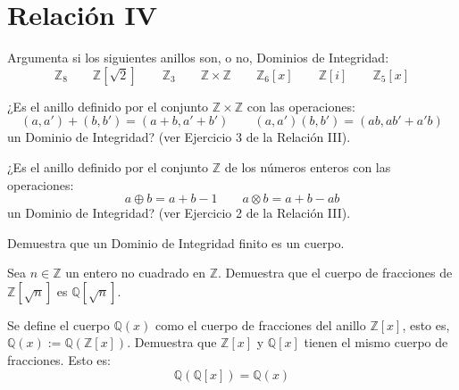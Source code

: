 \section{Relación IV}

\begin{ejercicio}
    Argumenta si los siguientes anillos son, o no, Dominios de Integridad:
    \begin{equation*}
        \mathbb{Z}_8 \qquad \mathbb{Z}\left[\sqrt{2}\right]\qquad \mathbb{Z}_3 \qquad \mathbb{Z}\times \mathbb{Z}\qquad \mathbb{Z}_6[x] \qquad \mathbb{Z}[i] \qquad \mathbb{Z}_5[x]
    \end{equation*}
\end{ejercicio}

\begin{ejercicio}
    ¿Es el anillo definido por el conjunto $\mathbb{Z}\times \mathbb{Z}$ con las operaciones:
    \begin{equation*}
        (a,a')+(b,b') = (a+b, a'+b')\qquad (a,a')(b,b') = (ab,ab'+a'b)
    \end{equation*}
    un Dominio de Integridad? (ver Ejercicio 3 de la Relación III).
\end{ejercicio}

\begin{ejercicio}
    ¿Es el anillo definido por el conjunto $\mathbb{Z}$ de los números enteros con las operaciones:
    \begin{equation*}
        a\oplus b = a+b-1 \qquad a\otimes b = a+b-ab
    \end{equation*}
    un Dominio de Integridad? (ver Ejercicio 2 de la Relación III).
\end{ejercicio}

\begin{ejercicio}
    Demuestra que un Dominio de Integridad finito es un cuerpo.
\end{ejercicio}

\begin{ejercicio}
    Sea $n\in \mathbb{Z}$ un entero no cuadrado en $\mathbb{Z}$. Demuestra que el cuerpo de fracciones de $\mathbb{Z}\left[\sqrt{n}\right]$ es $\mathbb{Q}\left[\sqrt{n}\right]$.
\end{ejercicio}

\begin{ejercicio}
    Se define el cuerpo $\mathbb{Q}(x)$ como el cuerpo de fracciones del anillo $\mathbb{Z}[x]$, esto es, $\mathbb{Q}(x) := \mathbb{Q}(\mathbb{Z}[x])$. Demuestra que $\mathbb{Z}[x]$ y $\mathbb{Q}[x]$ tienen el mismo cuerpo de fracciones. Esto es:
    \begin{equation*}
        \mathbb{Q}(\mathbb{Q}[x]) = \mathbb{Q}(x)
    \end{equation*}
\end{ejercicio}

